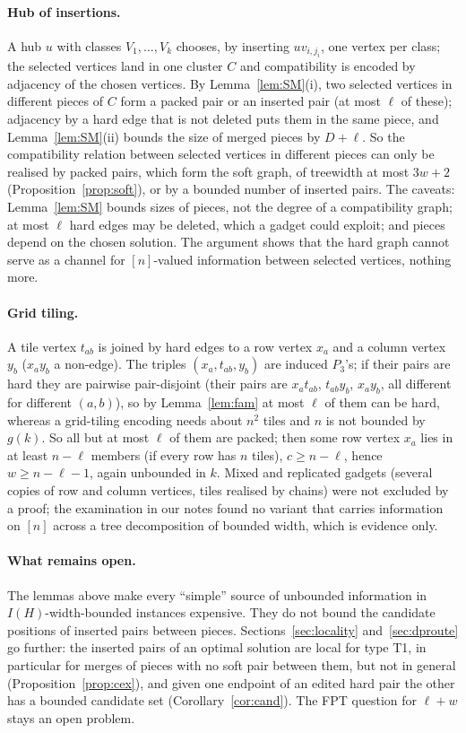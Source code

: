 \paragraph{Hub of insertions.} A hub $u$ with classes $V_1,\dots,V_k$ chooses, by inserting $uv_{i,j_i}$, one vertex per class; the selected vertices land in one cluster $C$ and compatibility is encoded by adjacency of the chosen vertices. By Lemma~\ref{lem:SM}(i), two selected vertices in different pieces of $C$ form a packed pair or an inserted pair (at most $\ell$ of these); adjacency by a hard edge that is not deleted puts them in the same piece, and Lemma~\ref{lem:SM}(ii) bounds the size of merged pieces by $D+\ell$. So the compatibility relation between selected vertices in different pieces can only be realised by packed pairs, which form the soft graph, of treewidth at most $3w+2$ (Proposition~\ref{prop:soft}), or by a bounded number of inserted pairs. The caveats: Lemma~\ref{lem:SM} bounds sizes of pieces, not the degree of a compatibility graph; at most $\ell$ hard edges may be deleted, which a gadget could exploit; and pieces depend on the chosen solution. The argument shows that the hard graph cannot serve as a channel for $[n]$-valued information between selected vertices, nothing more.

\paragraph{Grid tiling.} A tile vertex $t_{ab}$ is joined by hard edges to a row vertex $x_a$ and a column vertex $y_b$ ($x_ay_b$ a non-edge). The triples $(x_a,t_{ab},y_b)$ are induced $P_3$'s; if their pairs are hard they are pairwise pair-disjoint (their pairs are $x_at_{ab}$, $t_{ab}y_b$, $x_ay_b$, all different for different $(a,b)$), so by Lemma~\ref{lem:fam} at most $\ell$ of them can be hard, whereas a grid-tiling encoding needs about $n^2$ tiles and $n$ is not bounded by $g(k)$. So all but at most $\ell$ of them are packed; then some row vertex $x_a$ lies in at least $n-\ell$ members (if every row has $n$ tiles), $c\ge n-\ell$, hence $w\ge n-\ell-1$, again unbounded in $k$. Mixed and replicated gadgets (several copies of row and column vertices, tiles realised by chains) were not excluded by a proof; the examination in our notes found no variant that carries information on $[n]$ across a tree decomposition of bounded width, which is evidence only.

\paragraph{What remains open.} The lemmas above make every ``simple'' source of unbounded information in $I(H)$-width-bounded instances expensive. They do not bound the candidate positions of inserted pairs between pieces. Sections~\ref{sec:locality} and~\ref{sec:dproute} go further: the inserted pairs of an optimal solution are local for type T1, in particular for merges of pieces with no soft pair between them, but not in general (Proposition~\ref{prop:cex}), and given one endpoint of an edited hard pair the other has a bounded candidate set (Corollary~\ref{cor:cand}). The FPT question for $\ell+w$ stays an open problem.
